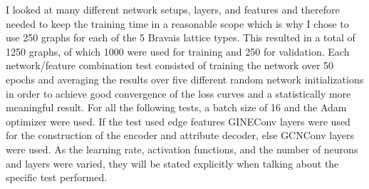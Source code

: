\documentclass[11pt,a4paper]{article}
\begin{document}
I looked at many different network setups, layers, and features and therefore needed to keep the training time in a reasonable scope which is why I chose to use 250 graphs for each of the 5 Bravais lattice types. 
This resulted in a total of 1250 graphs, of which 1000 were used for training and 250 for validation. 
Each network/feature combination test consisted of training the network over 50 epochs and averaging the results over five different random network initializations in order to achieve good convergence of the loss curves and a statistically more meaningful result. 
For all the following tests, a batch size of 16 and the Adam optimizer were used. 
If the test used edge features GINEConv layers \cite{pygteamGINEConv2024} were used for the construction of the encoder and attribute decoder, else GCNConv layers \cite{pygteamGCNConv2025} were used.
As the learning rate, activation functions, and the number of neurons and layers were varied, they will be stated explicitly when talking about the specific test performed. \\
\end{document}
